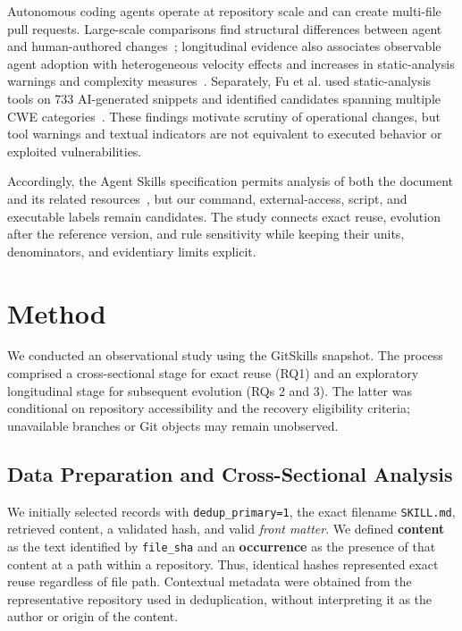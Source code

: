 \documentclass[conference]{IEEEtran}
\begin{document}
Autonomous coding agents operate at repository scale and can create multi-file pull requests. Large-scale comparisons find structural differences between agent and human-authored changes~\cite{ogenrwot2026}; longitudinal evidence also associates observable agent adoption with heterogeneous velocity effects and increases in static-analysis warnings and complexity measures~\cite{agarwal2026}. Separately, Fu et al. used static-analysis tools on 733 AI-generated snippets and identified candidates spanning multiple CWE categories~\cite{fu2025security}. These findings motivate scrutiny of operational changes, but tool warnings and textual indicators are not equivalent to executed behavior or exploited vulnerabilities.

Accordingly, the Agent Skills specification permits analysis of both the document and its related resources~\cite{agentskills-spec}, but our command, external-access, script, and executable labels remain candidates. The study connects exact reuse, evolution after the reference version, and rule sensitivity while keeping their units, denominators, and evidentiary limits explicit.


\section{Method}
We conducted an observational study using the GitSkills snapshot. The process comprised a cross-sectional stage for exact reuse (RQ1) and an exploratory longitudinal stage for subsequent evolution (RQs 2 and 3). The latter was conditional on repository accessibility and the recovery eligibility criteria; unavailable branches or Git objects may remain unobserved.

\subsection{Data Preparation and Cross-Sectional Analysis}

We initially selected records with \texttt{dedup\_primary=1}, the exact filename \texttt{SKILL.md}, retrieved content, a validated hash, and valid \textit{front matter}. We defined \textbf{content} as the text identified by \texttt{file\_sha} and an \textbf{occurrence} as the presence of that content at a path within a repository. Thus, identical hashes represented exact reuse regardless of file path. Contextual metadata were obtained from the representative repository used in deduplication, without interpreting it as the author or origin of the content.
\end{document}
